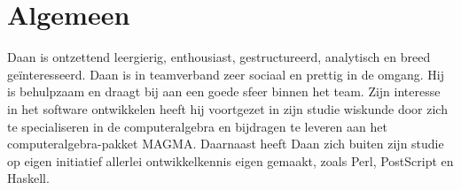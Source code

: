 \section*{Algemeen}

Daan is ontzettend leergierig, enthousiast, gestructureerd, analytisch en breed 
ge\"interesseerd. Daan is in teamverband zeer sociaal en prettig in de omgang. 
Hij is behulpzaam en draagt bij aan een goede sfeer binnen het team. Zijn 
interesse in het software ontwikkelen heeft hij voortgezet in zijn studie 
wiskunde door zich te specialiseren in de computeralgebra en bijdragen te 
leveren aan het computeralgebra-pakket MAGMA. Daarnaast heeft Daan zich buiten 
zijn studie op eigen initiatief allerlei ontwikkelkennis eigen gemaakt, zoals 
Perl, PostScript en Haskell.
